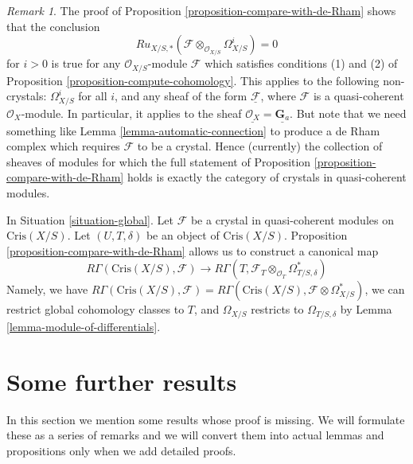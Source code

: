 \documentclass{stacks-project}
\theoremstyle{plain}
\theoremstyle{definition}
\theoremstyle{remark}
\newtheorem{remark}[subsection]{Remark}
\numberwithin{equation}{subsection}
\begin{document}
\begin{remark}
\label{remark-vanishing}
The proof of Proposition \ref{proposition-compare-with-de-Rham}
shows that the conclusion
$$
Ru_{X/S, *}(\mathcal{F} \otimes_{\mathcal{O}_{X/S}} \Omega^i_{X/S}) = 0
$$
for $i > 0$ is true for any $\mathcal{O}_{X/S}$-module
$\mathcal{F}$ which satisfies conditions (1) and (2) of
Proposition \ref{proposition-compute-cohomology}.
This applies to the following non-crystals:
$\Omega^i_{X/S}$ for all $i$, and any sheaf of the form
$\underline{\mathcal{F}}$, where $\mathcal{F}$ is a quasi-coherent
$\mathcal{O}_X$-module. In particular, it applies to the
sheaf $\underline{\mathcal{O}_X} = \underline{\mathbf{G}_a}$.
But note that we need something like Lemma \ref{lemma-automatic-connection}
to produce a de Rham complex which requires $\mathcal{F}$ to be a crystal.
Hence (currently) the collection of sheaves of modules for which the full
statement of Proposition \ref{proposition-compare-with-de-Rham} holds
is exactly the category of crystals in quasi-coherent modules.
\end{remark}

\noindent
In Situation \ref{situation-global}.
Let $\mathcal{F}$ be a crystal in quasi-coherent modules on
$\text{Cris}(X/S)$. Let $(U, T, \delta)$ be an object of
$\text{Cris}(X/S)$. Proposition \ref{proposition-compare-with-de-Rham}
allows us to construct a canonical map
\begin{equation}
\label{equation-restriction}
R\Gamma(\text{Cris}(X/S), \mathcal{F})
\longrightarrow
R\Gamma(T, \mathcal{F}_T \otimes_{\mathcal{O}_T} \Omega^*_{T/S, \delta})
\end{equation}
Namely, we have $R\Gamma(\text{Cris}(X/S), \mathcal{F}) =
R\Gamma(\text{Cris}(X/S), \mathcal{F} \otimes \Omega^*_{X/S})$,
we can restrict global cohomology classes to $T$, and $\Omega_{X/S}$
restricts to $\Omega_{T/S, \delta}$ by
Lemma \ref{lemma-module-of-differentials}.

















\section{Some further results}
\label{section-missing}

\noindent
In this section we mention some results whose proof is missing.
We will formulate these as a series of remarks and we will convert
them into actual lemmas and propositions only when we add detailed
proofs.
\end{document}
